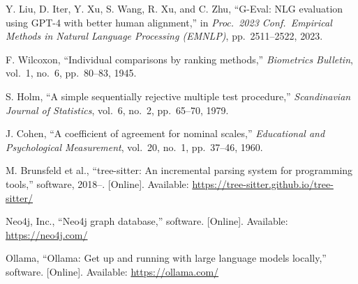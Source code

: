\documentclass[conference]{IEEEtran}
\newif\ifUNVERIFIED
\begin{document}
\begin{thebibliography}{00}
Y. Liu, D. Iter, Y. Xu, S. Wang, R. Xu, and C. Zhu,
``G-Eval: NLG evaluation using GPT-4 with better human alignment,''
in \emph{Proc.\ 2023 Conf.\ Empirical Methods in Natural Language Processing (EMNLP)},
pp.\ 2511--2522, 2023.

F. Wilcoxon,
``Individual comparisons by ranking methods,''
\emph{Biometrics Bulletin}, vol.\ 1, no.\ 6, pp.\ 80--83, 1945.

S. Holm,
``A simple sequentially rejective multiple test procedure,''
\emph{Scandinavian Journal of Statistics}, vol.\ 6, no.\ 2, pp.\ 65--70, 1979.

J. Cohen,
``A coefficient of agreement for nominal scales,''
\emph{Educational and Psychological Measurement}, vol.\ 20, no.\ 1, pp.\ 37--46, 1960.

M. Brunsfeld et al.,
``tree-sitter: An incremental parsing system for programming tools,''
software, 2018--. [Online]. Available: \url{https://tree-sitter.github.io/tree-sitter/}

Neo4j, Inc.,
``Neo4j graph database,''
software. [Online]. Available: \url{https://neo4j.com/}

Ollama,
``Ollama: Get up and running with large language models locally,''
software. [Online]. Available: \url{https://ollama.com/}

\ifUNVERIFIED
\bibitem{spearman1904proof}
C. Spearman,
``The proof and measurement of association between two things,''
\emph{American Journal of Psychology}, vol.\ 15, no.\ 1, pp.\ 72--101, 1904.
\fi

\end{thebibliography}
\end{document}
